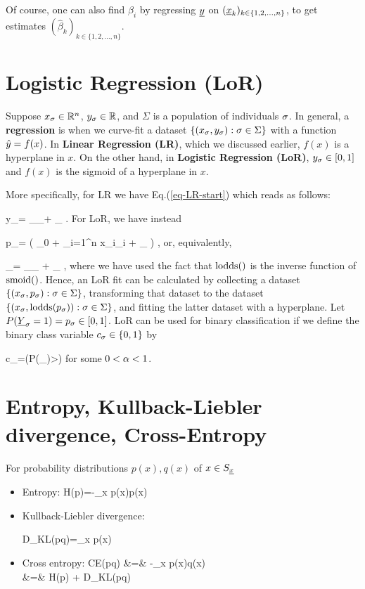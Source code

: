 Of course, one can also
find $\hat{\beta}_i$
by regressing ${\underline{y}}$
on $({\underline{x}}_k)_{k\in \{1,2, 
\ldots, n\}}$, to get
estimates 
$(\hat{\beta}_k)_{k\in \{1,2, 
\ldots, n\}}$. 

\section{Logistic Regression (LoR)}

Suppose
$x_\sigma\in { \mathbb{R}}^n$,
$y_\sigma\in { \mathbb{R}}$,
and $\Sigma$
is a population
of individuals $\sigma$.
In general,
a {\bf regression}
is when
we curve-fit a dataset
$\{(x_\sigma, y_\sigma):\sigma\in\Sigma\}$
with a function 
${\hat{y}}=f(x)$.
In {\bf Linear
Regression (LR)},
which we 
discussed earlier,
$f(x)$ is a hyperplane
in $x$.
On the other hand,
in {\bf Logistic Regression (LoR)},
$y_\sigma\in[0,1]$ and
$f(x)$ is the sigmoid of
a hyperplane in $x$.



More specifically, for LR
we have
Eq.(\ref{eq-LR-start})
which reads as follows:

\beq
y_\s= 
_{\haty_\s}+ \eps_\s
\quad{}\;.
\eeq
For LoR, we have instead

\beq
p_\s= 
\smoid\left(
\beta_0 +
\sum_{i=1}^{n} x_{\s i}\beta_{i} + \eps_\s
\right)
\quad{}\;,
\eeq
or, equivalently,


\beq
{}
_{\ln {}}=
_{\haty_\s} + \eps_\s
\quad{}\;,
\eeq
where we have used the fact that 
${\rm lodds}()$
is the inverse function of ${\rm smoid}()$.
Hence, an LoR 
fit can be calculated by
collecting a dataset
$\{(x_\sigma, p_\sigma):\sigma\in\Sigma\}$,
transforming that
dataset to the dataset
$\{(x_\sigma,{\rm lodds}( p_\sigma)):\sigma\in\Sigma\}$,
and fitting the latter dataset
with a hyperplane.
Let $P({\underline{Y}}_\sigma=1)=p_\sigma\in [0,1]$.
LoR can be used 
for binary
classification
if we define the 
binary class 
variable $c_\sigma\in \{0,1\}$ by

\beq
c_\s =\indi(P(\rvY_)>\alp)
\eeq
for some $0<\alpha<1$.



\section{Entropy,
 Kullback-Liebler divergence, Cross-Entropy}

For probability distributions $p(x), q(x)$ of $x\in S_{\underline{x}}$
\begin{itemize}
\item 
Entropy:
\beq
H(p)=-\sum_x p(x)\ln p(x)
\eeq

\item
Kullback-Liebler divergence:

\beq
D_{KL}(p\parallel q)=\sum_{x} p(x)\ln {}
\eeq
\item 
Cross entropy:
\beqa
CE(p\parallel q) &=& -\sum_x p(x)\ln q(x)\\
&=& H(p) + D_{KL}(p\parallel q)
\eeqa
\end{itemize}

